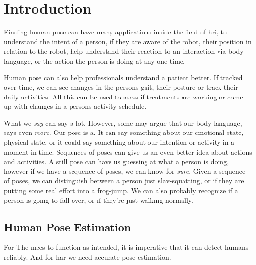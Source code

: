 \chapter{Introduction}








Finding human pose can have many applications inside the field of \gls{hri}, to understand the intent of a person, if they are aware of the robot, their position in relation to the robot, help understand their reaction to an interaction via body-language, or the action the person is doing at any one time.

Human pose can also help professionals understand a patient better. If tracked over time, we can see changes in the persons gait, their posture or track their daily activities. All this can be used to asess if treatments are working or come up with changes in a persons activity schedule.


What we \textit{say} can say a lot. However, some may argue that our body language, says even \textit{more}. Our pose is a. It can say something about our emotional state, physical state, or it could say something about our intention or activity in a moment in time. Sequences of poses can give us an even better idea about actions and activities. A still pose can have us guessing at what a person is doing, however if we have a sequence of poses, we can know for \textit{sure}. Given a sequence of poses, we can distinguish between a person just slav-squatting, or if they are putting some real effort into a frog-jump. We can also probably recognize if a person is going to fall over, or if they're just walking normally.




\section{Human Pose Estimation}
For The \gls{mecs} to function as intended, it is imperative that it can detect humans reliably. And for \gls{har} we need accurate pose estimation.

